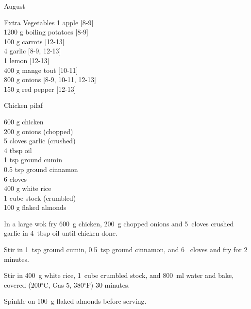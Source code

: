 \begin{menu}{August}
      \begin{shoppinglist}{Extra Vegetables}
      1  apple 
        {\scriptsize[8-9]}\\
      1200 g boiling potatoes 
        {\scriptsize[8-9]}\\
      100 g carrots 
        {\scriptsize[12-13]}\\
      4  garlic 
        {\scriptsize[8-9, 12-13]}\\
      1  lemon 
        {\scriptsize[12-13]}\\
      400 g mange tout 
        {\scriptsize[10-11]}\\
      800 g onions 
        {\scriptsize[8-9, 10-11, 12-13]}\\
      150 g red pepper 
        {\scriptsize[12-13]}\\
      \end{shoppinglist}%
      \par\vfil %
    \vfil\clearpage
  
    \begin{recipe}{2}{Chicken pilaf}%
    
		\begin{ingredients}
		600 g chicken  \\
	200 g onions (chopped) \\
	5 cloves garlic (crushed) \\
	4 tbsp oil  \\
	1 tsp ground cumin  \\
	0.5 tsp ground cinnamon  \\
	6  cloves  \\
	400 g white rice  \\
	1 cube stock (crumbled) \\
	100 g flaked almonds  \\
	
		\end{ingredients}
	
    \begin{instructions}
    \item 
        In a large wok fry
        600~g  chicken,
        200~g chopped onions
        and
        5~cloves crushed garlic
        in
        4~tbsp  oil
        until chicken done.
      \item 
        Stir in
        1~tsp  ground cumin,
        0.5~tsp  ground cinnamon,
        and
        6~  cloves
        and fry for 2 minutes.
      \item 
        Stir in
        400~g  white rice,
        1~cube crumbled stock,
        and
        800~ml  water
        and bake, covered 
      (200$^{\circ}$C, Gas 5, 380$^{\circ}$F)
     30 minutes.
      \item 
        Spinkle on
        100~g  flaked almonds
        before serving.
      

\end{instructions}
\end{recipe}
\end{menu}
